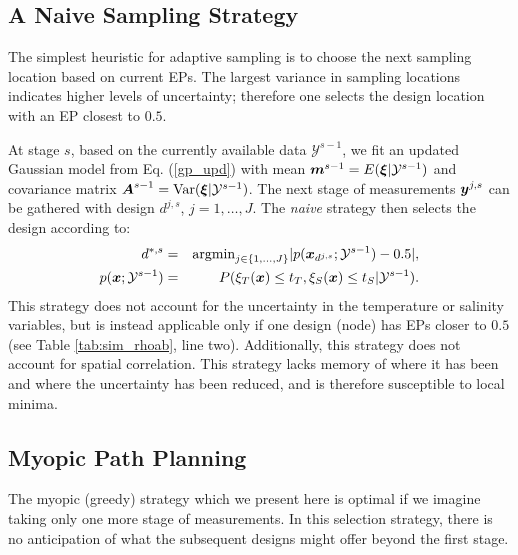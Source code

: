 \documentclass[aoas]{imsart}
\begin{document}
 
\subsection{A Naive Sampling Strategy}
\label{naive}

The simplest heuristic for adaptive sampling is to choose the next
sampling location based on current EPs. The largest variance in
sampling locations indicates higher levels of uncertainty; therefore
one selects the design location with an EP closest to $0.5$.

At stage $s$, based on the currently available data
$\mathcal{Y}^{s-1}$, we fit an updated Gaussian model from
Eq. (\ref{gp_upd}) with mean ${\boldsymbol m}^{s-1}=E({\boldsymbol \xi}|\mathcal{Y}^{s-1})$
and covariance matrix ${\boldsymbol A}^{s-1}=\mbox{Var}({\boldsymbol \xi}|\mathcal{Y}^{s-1})$.
The next stage of measurements ${\boldsymbol y}^{j,s}$ can be gathered with
design $d^{j,s}$, $j=1,\ldots,J$. The {\it{naive}} strategy then
selects the design according to:
\begin{eqnarray}\label{critNaive}
    d^{*,s} &=& \mbox{argmin}_{j \in \{1,\ldots,J\}} |p(\bx_{d^{j,s}};\mathcal{Y}^{s-1})-0.5|, \\
    p(\bx;\mathcal{Y}^{s-1}) &=& P(\xi_T(\bx) \leq t_T, \xi_S(\bx) \leq t_S | \mathcal{Y}^{s-1}). \nonumber
\end{eqnarray}
This strategy does not account for the uncertainty in the temperature
or salinity variables, but is instead applicable only if one design (node) has EPs closer to
$0.5$ (see Table \ref{tab:sim_rhoab}, line two). Additionally, this strategy does not
account for spatial correlation. This strategy lacks memory of where
it has been and where the uncertainty has been reduced, and is therefore
susceptible to local minima.

\subsection{Myopic Path Planning}
\label{sec:myopic}

The myopic (greedy) strategy which we present here is optimal if we
imagine taking only one more stage of measurements. In this selection
strategy, there is no anticipation of what the subsequent designs might
offer beyond the first stage.
\end{document}
